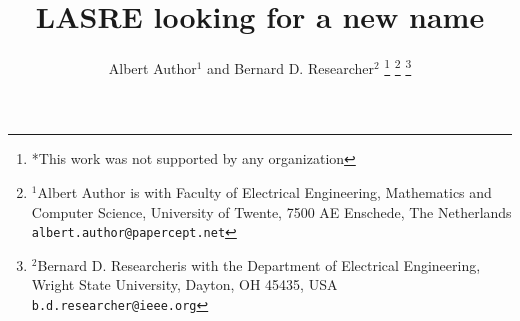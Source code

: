 \documentclass[letterpaper, 10 pt, conference]{ieeeconf}  %
\title{\LARGE \bf
LASRE looking for a new name
}
\author{Albert Author$^{1}$ and Bernard D. Researcher$^{2}$%
\thanks{*This work was not supported by any organization}%
\thanks{$^{1}$Albert Author is with Faculty of Electrical Engineering, Mathematics and Computer Science,
        University of Twente, 7500 AE Enschede, The Netherlands
        {\tt\small albert.author@papercept.net}}%
\thanks{$^{2}$Bernard D. Researcheris with the Department of Electrical Engineering, Wright State University,
        Dayton, OH 45435, USA
        {\tt\small b.d.researcher@ieee.org}}%
}
\begin{document}
\maketitle
\thispagestyle{empty}
\pagestyle{empty}


\begin{abstract}


\end{abstract}










\addtolength{\textheight}{-12cm}   %
















\end{document}
